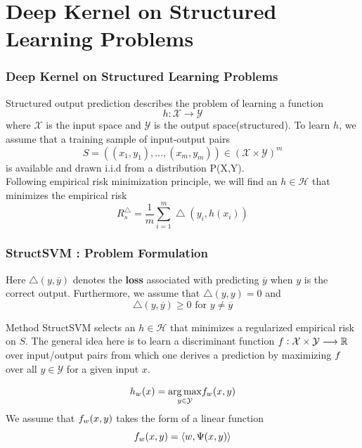 \documentclass{beamer}
\begin{document}

\section{Deep Kernel on Structured Learning Problems}
\begin{frame}
\frametitle{Deep Kernel on Structured Learning Problems}
Structured output prediction describes the problem of learning a function
\[ h: \mathcal{X} \longrightarrow \mathcal{Y} \]
where $\mathcal{X}$ is the input space and $\mathcal{Y}$ is the output space(structured). To learn $h$, we assume that a training sample of input-output pairs
\[ S = ((x_1, y_1), \ldots, (x_m, y_m)) \in (\mathcal{X} \times \mathcal{Y})^m \]
is available and drawn i.i.d from a distribution P(X,Y).\\
Following empirical risk minimization principle, we will find an $h \in \mathcal{H}$ that minimizes the empirical risk
\[ R_s^{\bigtriangleup} = \frac{1}{m} \sum_{i=1}^m \bigtriangleup(y_i, h(x_i)) \]
\end{frame}


\begin{frame}
\frametitle{StructSVM : Problem Formulation}
Here $\bigtriangleup(y, \overline{y})$ denotes the \textbf{loss} associated with predicting $\overline{y}$ when $y$ is the correct output. Furthermore, we assume that $\bigtriangleup(y,y) = 0 $ and 
\[ \bigtriangleup(y, \overline{y}) \geq 0 \textrm{ for } y \neq \overline{y} \]
\begin{block}{Method}
StructSVM selects an $h \in \mathcal{H}$ that minimizes a regularized empirical risk\\
on $S$. The general idea here is to learn a discriminant function $\mathnormal{f} : \mathcal{X} \times \mathcal{Y} \longrightarrow \mathbb{R}$ over input/output pairs from which one derives a prediction by maximizing $\mathnormal{f}$ over all $y \in \mathcal{Y}$ for a given input $x$.
\end{block}
\[ h_w(x) =  \underset{y \in \mathcal{Y}}{\arg\max} \mathnormal{f}_w(x,y) \]
We assume that $\mathnormal{f}_w(x,y)$ takes the form of a linear function
\[ \mathnormal{f}_w(x,y) = \langle w , \Psi(x,y) \rangle \]
\end{frame}
\end{document}
